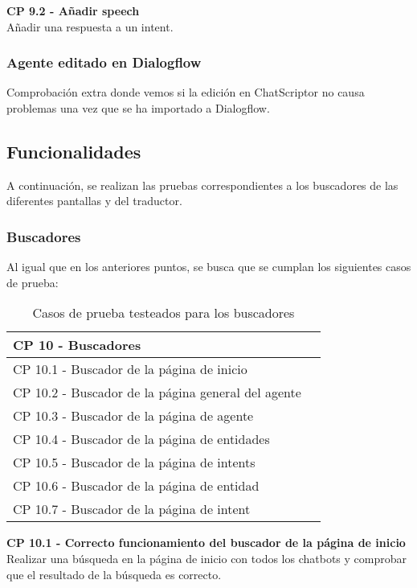 \textbf{CP 9.2 - Añadir speech} \\
Añadir una respuesta a un intent.

\subsubsection{Agente editado en Dialogflow}
Comprobación extra donde vemos si la edición en ChatScriptor no causa problemas una vez que se ha importado a Dialogflow.

\subsection{Funcionalidades}
A continuación, se realizan las pruebas correspondientes a los buscadores de las diferentes pantallas y del traductor.

\subsubsection{Buscadores}
Al igual que en los anteriores puntos, se busca que se cumplan los siguientes casos de prueba:

\begin{table}[H]
\centering
\begin{tabular}{ll}
\toprule
CP 10 - Buscadores   \\
\midrule
CP 10.1 - Buscador de la página de inicio  \\
CP 10.2 - Buscador de la página general del agente \\
CP 10.3 - Buscador de la página de agente \\
CP 10.4 - Buscador de la página de entidades \\
CP 10.5 - Buscador de la página de intents \\
CP 10.6 - Buscador de la página de entidad \\
CP 10.7 - Buscador de la página de intent \\
\bottomrule
\end{tabular}
\caption{Casos de prueba testeados para los buscadores}
\end{table}

\textbf{CP 10.1 - Correcto funcionamiento del buscador de la página de inicio} \\
Realizar una búsqueda en la página de inicio con todos los chatbots y comprobar que el resultado de la búsqueda es correcto.

